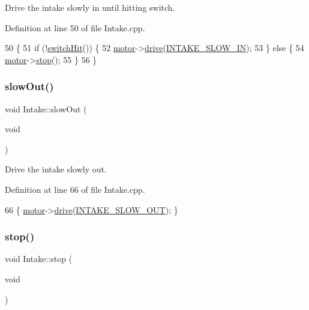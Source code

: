 Drive the intake slowly in until hitting switch. 



Definition at line 50 of file Intake.\+cpp.


\begin{DoxyCode}
50                         \{
51     \textcolor{keywordflow}{if} (!\hyperlink{class_intake_ae9bf8ae8ebed0f1ba36443373eb0ae63}{switchHit}()) \{
52         \hyperlink{class_intake_abfffad571bacf945d6a2a121f59869fd}{motor}->\hyperlink{class_v_e_x_motor_ac8ab5c30e4be4a9e3ed290e7827bcf1a}{drive}(\hyperlink{_intake_8hpp_a216de4996c0f877df3af487015b7e14a}{INTAKE\_SLOW\_IN});
53     \} \textcolor{keywordflow}{else} \{
54         \hyperlink{class_intake_abfffad571bacf945d6a2a121f59869fd}{motor}->\hyperlink{class_v_e_x_motor_aed9dadedda6a075093f076921958e7ed}{stop}();
55     \}
56 \}
\end{DoxyCode}
\mbox{\label{class_intake_a1b3dccca0c1805d7930d7289a5636c09}} 
\subsubsection{\texorpdfstring{slow\+Out()}{slowOut()}}
{\footnotesize\ttfamily void Intake\+::slow\+Out (\begin{DoxyParamCaption}\item[{void}]{ }\end{DoxyParamCaption})}



Drive the intake slowly out. 



Definition at line 66 of file Intake.\+cpp.


\begin{DoxyCode}
66 \{ \hyperlink{class_intake_abfffad571bacf945d6a2a121f59869fd}{motor}->\hyperlink{class_v_e_x_motor_ac8ab5c30e4be4a9e3ed290e7827bcf1a}{drive}(\hyperlink{_intake_8hpp_a4d64b806b8e8a356c3e015add0485d01}{INTAKE\_SLOW\_OUT}); \}
\end{DoxyCode}
\mbox{\label{class_intake_a3780c5eb8a67c524cc793aaa631ce62e}} 
\subsubsection{\texorpdfstring{stop()}{stop()}}
{\footnotesize\ttfamily void Intake\+::stop (\begin{DoxyParamCaption}\item[{void}]{ }\end{DoxyParamCaption})}



